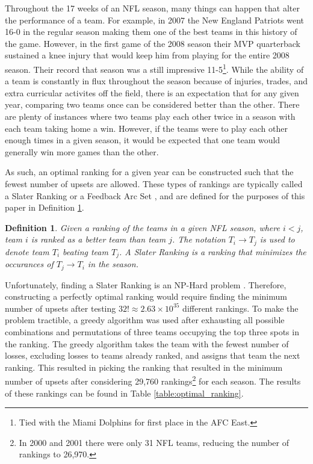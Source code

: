 \documentclass[11pt]{article}
\newtheorem{definition}{Definition}
\begin{document}
Throughout the 17 weeks of an NFL season, many things can happen that alter the performance of a team. For example, in 2007 the New England Patriots went 16-0\cite{ESPN:ne_2007} in the regular season making them one of the best teams in this history of the game. However, in the first game of the 2008 season their MVP quarterback sustained a knee injury that would keep him from playing for the entire 2008 season.\cite{wiki:tom_brady} Their record that season was a still impressive 11-5\footnote{Tied with the Miami Dolphins for first place in the AFC East.}.\cite{ESPN:ne_2008} While the ability of a team is constantly in flux throughout the season because of injuries, trades, and extra curricular activites off the field, there is an expectation that for any given year, comparing two teams once can be considered better than the other. There are plenty of instances where two teams play each other twice in a season with each team taking home a win. However, if the teams were to play each other enough times in a given season, it would be expected that one team would generally win more games than the other.

As such, an optimal ranking for a given year can be constructed such that the fewest number of upsets are allowed. These types of rankings are typically called a Slater Ranking \cite{biometrika_slater} or a Feedback Arc Set \cite{combinatorics_charbit} \cite{discrete_math_alon}, and are defined for the purposes of this paper in Definition \ref{def:slater_ranking}.

\begin{definition}\label{def:slater_ranking}
Given a ranking of the teams in a given NFL season, where $i < j$, team $i$ is ranked as a better team than team $j$. The notation $T_i \rightarrow T_j$ is used to denote team $T_i$ beating team $T_j$. A Slater Ranking is a ranking that minimizes the occurances of $T_j \rightarrow T_i$ in the season.
\end{definition}

Unfortunately, finding a Slater Ranking is an NP-Hard problem \cite{combinatorics_charbit} \cite{discrete_math_alon}. Therefore, constructing a perfectly optimal ranking would require finding the minimum number of upsets after testing $32! \approx 2.63 \times 10^{35}$ different rankings. To make the problem tractible, a greedy algorithm was used after exhausting all possible combinations and permutations of three teams occupying the top three spots in the ranking. The greedy algorithm takes the team with the fewest number of losses, excluding losses to teams already ranked, and assigns that team the next ranking. This resulted in picking the ranking that resulted in the minimum number of upsets after considering 29,760 rankings\footnote{In 2000 and 2001 there were only 31 NFL teams, reducing the number of rankings to 26,970.} for each season. The results of these rankings can be found in Table \ref{table:optimal_ranking}.
\end{document}
